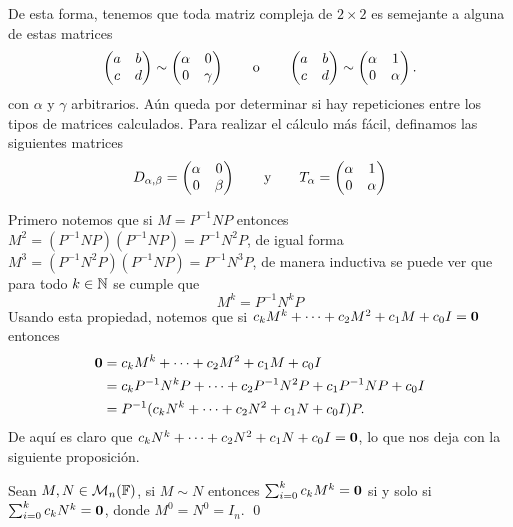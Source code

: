 De esta forma, tenemos que toda matriz compleja de $2 \times 2$ es semejante a alguna de estas matrices
\begin{equation}
  \begin{pmatrix} a & b \\ c & d \end{pmatrix} \sim \begin{pmatrix} \alpha & 0 \\ 0 & \gamma \end{pmatrix}
    \qquad\text{o}\qquad
    \begin{pmatrix} a & b \\ c & d \end{pmatrix} \sim \begin{pmatrix} \alpha & 1 \\ 0 & \alpha \end{pmatrix}.
      \label{eq:M2Form}
\end{equation}
con $\alpha$ y $\gamma$ arbitrarios. Aún queda por determinar si hay repeticiones entre los tipos de matrices calculados. Para realizar el cálculo más fácil, definamos las siguientes matrices 
\[
  D_{\alpha,\beta} = \begin{pmatrix} \alpha & 0 \\ 0 & \beta \end{pmatrix}
     \qquad\text{y}\qquad
  T_\alpha = \begin{pmatrix} \alpha & 1 \\ 0 & \alpha \end{pmatrix}
\]

Primero notemos que si $M = P^{-1} N P$ entonces $M^2 = (P^{-1} N P)(P^{-1} N P) = P^{-1}N^2 P$, de igual forma $M^3 = (P^{-1}N^2 P) (P^{-1} N P) = P^{-1}N^3 P$, de manera inductiva se puede ver que para todo $k \in \mathbb{N}$ se cumple que
\[
  M^k = P^{-1} N^k P
\]
Usando esta propiedad, notemos que si $c_k M^k + \cdots + c_2 M^2 + c_1 M + c_0 I = \mathbf{0}$ entonces
\begin{align*}
  \mathbf{0} &= c_k M^k + \cdots + c_2 M^2 + c_1 M + c_0 I \\
    &= c_k P^{-1}N^k P + \cdots + c_2 P^{-1}N^2 P + c_1 P^{-1}N P + c_0 I \\
    &= P^{-1} (c_k N^k + \cdots + c_2 N^2 + c_1 N + c_0 I) P.
\end{align*}
De aquí es claro que $c_k N^k + \cdots + c_2 N^2 + c_1 N + c_0 I = \mathbf{0}$, lo que nos deja con la siguiente proposición.

\begin{prop} \label{prop:MPolySem}
  Sean $M, N \in \mathcal{M}_n(\mathbb{F})$, si $M \sim N$ entonces $\sum_{i=0}^k c_k M^k = \mathbf{0}$ si y solo si $\sum_{i=0}^k c_k N^k = \mathbf{0}$, donde $M^0 = N^0= I_n$. \qed
\end{prop}

